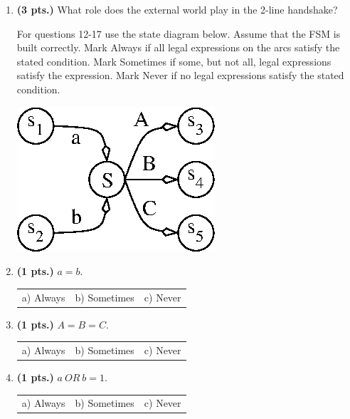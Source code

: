 \documentclass{article}
\begin{document}
\begin{enumerate}
\item {\bf (3 pts.)} What role does the external world play in the 
2-line handshake?


\pagebreak
For questions 12-17 use the state diagram below.  Assume that the
FSM is built correctly.  Mark Always if all legal expressions
on the arcs satisfy the stated condition. Mark Sometimes if some,
but not all, legal expressions satisfy the expression.  Mark
Never if no legal expressions satisfy the stated condition.

\includegraphics{./Fig3/trans.eps}

\item{\bf (1 pts.)} $a = b$.

\begin{tabular}{p{1.25in}p{1.25in}p{1.25in}}
a) Always  & b) Sometimes & c) Never  \\
\end{tabular}

\item{\bf (1 pts.)} $A = B = C$.

\begin{tabular}{p{1.25in}p{1.25in}p{1.25in}}
a) Always  & b) Sometimes & c) Never  \\
\end{tabular}

\item{\bf (1 pts.)} $a\  OR\  b = 1$.

\begin{tabular}{p{1.25in}p{1.25in}p{1.25in}}
a) Always  & b) Sometimes & c) Never  \\
\end{tabular}


\end{enumerate}
\end{document}
